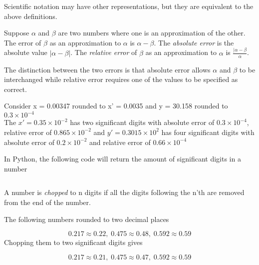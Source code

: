 	Scientific notation may have other representations, but they are equivalent to the above definitions.

	
\begin{definition}
		Suppose \(\alpha\) and \(\beta\) are two numbers where one is an approximation of the other. The error of \(\beta\) as an approximation to \(\alpha\) is \(\alpha - \beta\). The \textit{absolute error} is the absolute value \(|\alpha-\beta|\). The \textit{relative error} of \(\beta\) as an approximation to \(\alpha\) is \(\frac{|\alpha-\beta}{\alpha}\).
	
\end{definition}

	The distinction between the two errors is that absolute error allows \(\alpha\) and \(\beta\) to be interchanged while relative error requires one of the values to be specified as correct.

	
\begin{example}
		Consider x = 0.00347 rounded to x' = 0.0035 and y = 30.158 rounded to \(0.3\times 10^{-4}\)\\
		The \(x' = 0.35\times 10^{-2}\) has two significant digits with absolute error of \(0.3\times 10^{-4}\), relative error of \(0.865\times 10^{-2}\) and \(y' = 0.3015\times 10^{2}\) has four significant digits with absolute error of \(0.2\times 10^{-2}\) and relative error of \(0.66\times 10^{-4}\)
	
\end{example}

In Python, the following code will return the amount of significant digits in a number
\inputminted[frame = lines, bgcolor = lightgray, linenos]{python}{PythonSources/sigfigs.py}
	
\begin{definition}
		A number is \textit{chopped} to n digits if all the digits following the n'th are removed from the end of the number.
	
\end{definition}

	
\begin{example}
		The following numbers rounded to two decimal places
			
\[
0.217 \approx 0.22,\; 0.475\approx 0.48,\; 0.592\approx 0.59
\]
		Chopping them to two significant digits gives
			
\[
0.217 \approx 0.21,\; 0.475\approx 0.47,\; 0.592\approx 0.59
\]
	
\end{example}

